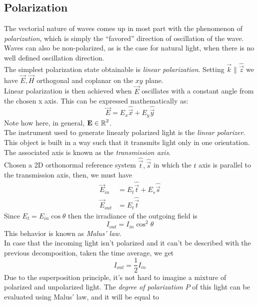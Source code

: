 \documentclass[../electromagnetism.tex]{subfiles}
\begin{document}
\subsection{Polarization}
The vectorial nature of waves comes up in most part with the phenomenon of \textit{polarization}, which is simply the ``favored'' direction of oscillation of the wave. Waves can also be non-polarized, as is the case for natural light, when there is no well defined oscillation direction.\\
The simplest polarization state obtainable is \textit{linear polarization}. Setting $\vec{k}\parallel\hat{\vec{z}}$ we have $\vec{E},\vec{H}$ orthogonal and coplanar on the $xy$ plane.\\
Linear polarization is then achieved when $\vec{E}$ oscillates with a constant angle from the chosen x axis. This can be expressed mathematically as:
\begin{equation}
	\vec{E}=E_x\hat{\vec{x}}+E_y\hat{\vec{y}}
	\label{eq:linear.pol}
\end{equation}
Note how here, in general, $\mathbf{E}\in\operatorname{\mathbb{R}}^2$.\\
The instrument used to generate linearly polarized light is the \textit{linear polarizer}. This object is built in a way such that it transmits light only in one orientation. The associated axis is known as the \textit{transmission axis}.\\
Chosen a 2D orthonormal reference system $\hat{\vec{t}},\hat{\vec{s}}$ in which the $t$ axis is parallel to the transmission axis, then, we must have
\begin{equation*}
	\begin{aligned}
		\vec{E}_{in}&= E_t\hat{\vec{t}}+E_s\hat{\vec{s}}\\
		\vec{E}_{out}&= E_t\hat{\vec{t}}
	\end{aligned}
\end{equation*}
Since $E_t=E_{in}\cos\theta$ then the irradiance of the outgoing field is
\begin{equation}
	I_{out}=I_{in}\cos^2\theta
	\label{eq:malus.pol}
\end{equation}
This behavior is known as \textit{Malus' law}.\\
In case that the incoming light isn't polarized and it can't be described with the previous decomposition, taken the time average, we get
\begin{equation*}
	I_{out}=\frac{1}{2}I_{in}
\end{equation*}
Due to the superposition principle, it's not hard to imagine a mixture of polarized and unpolarized light. The \textit{degree of polarization} $P$ of this light can be evaluated using Malus' law, and it will be equal to
\end{document}
